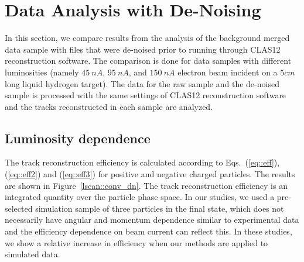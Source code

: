 \section{Data Analysis with De-Noising}

In this section, we compare results from the analysis of the background merged data sample with files that were de-noised prior to running through CLAS12 reconstruction software. The comparison is done for data samples with different luminosities (namely $45~nA$, $95~nA$, and $150~nA$ electron beam incident on a $5cm$ long liquid hydrogen target). The data for the raw sample and the de-noised sample is processed with the same settings of CLAS12 reconstruction software and the tracks reconstructed in each sample are analyzed.

\subsection{Luminosity dependence}

The track reconstruction efficiency is calculated according to Eqs.~(\ref{eq::eff}), (\ref{eq::eff2}) and (\ref{eq::eff3}) for positive and negative charged particles. The results are shown in Figure~\ref{lscan::conv_dn}. The track reconstruction efficiency is an integrated quantity over the particle phase space. In our studies, we used a pre-selected simulation sample of three particles in the final state, which does not necessarily have angular and momentum dependence similar to experimental data and the efficiency dependence on beam current can reflect this. In these studies, we show a relative increase in efficiency when our methods are applied to simulated data.

